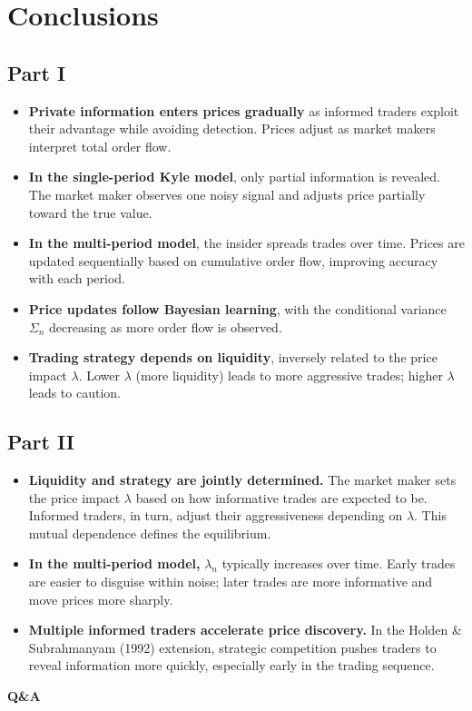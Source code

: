 \documentclass{beamer}
\begin{document}
\section{Conclusions}
\subsection{Part I}

\begin{frame}

\begin{itemize}\small
    \item \textbf{Private information enters prices gradually} as informed traders exploit their advantage while avoiding detection. Prices adjust as market makers interpret total order flow.

    \item \textbf{In the single-period Kyle model}, only partial information is revealed. The market maker observes one noisy signal and adjusts price partially toward the true value.

    \item \textbf{In the multi-period model}, the insider spreads trades over time. Prices are updated sequentially based on cumulative order flow, improving accuracy with each period.

    \item \textbf{Price updates follow Bayesian learning}, with the conditional variance \( \Sigma_n \) decreasing as more order flow is observed.

    \item \textbf{Trading strategy depends on liquidity}, inversely related to the price impact \( \lambda \). Lower \( \lambda \) (more liquidity) leads to more aggressive trades; higher \( \lambda \) leads to caution.
\end{itemize}
\end{frame}

\subsection{Part II}
\begin{frame}
\begin{itemize}\small
    \item \textbf{Liquidity and strategy are jointly determined.} The market maker sets the price impact \(\lambda\) based on how informative trades are expected to be. Informed traders, in turn, adjust their aggressiveness depending on \(\lambda\). This mutual dependence defines the equilibrium.

    \item \textbf{In the multi-period model,} \(\lambda_n\) typically increases over time. Early trades are easier to disguise within noise; later trades are more informative and move prices more sharply.

    \item \textbf{Multiple informed traders accelerate price discovery.} In the Holden & Subrahmanyam (1992) extension, strategic competition pushes traders to reveal information more quickly, especially early in the trading sequence.
\end{itemize}
\end{frame}

\begin{frame}
\centering
{\Huge \textbf{Q\&A}}
\end{frame}
\end{document}
